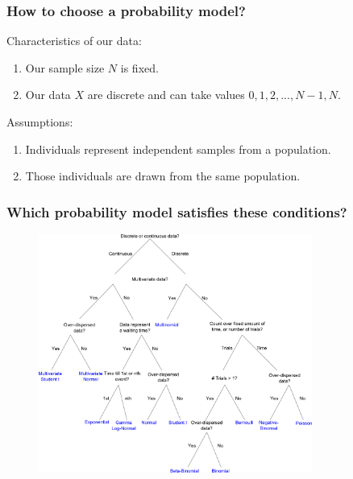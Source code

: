 \documentclass[handout]{beamer}
\begin{document}
\begin{frame}
	\frametitle{How to choose a probability model?}
	
	Characteristics of our data:
	
	\begin{enumerate}
		\item Our sample size $N$ is fixed.
		\item Our data $X$ are discrete and can take values $0, 1, 2, ..., N-1, N$.
	\end{enumerate}
	
	Assumptions:
	
	\begin{enumerate}
		\item Individuals represent independent samples from a population.
		\item Those individuals are drawn from the same population.
	\end{enumerate}
	
\end{frame}

\begin{frame}
	\frametitle{Which probability model satisfies these conditions?}
	\begin{figure}[h]
		\centerline{\includegraphics[width=0.8\textwidth]{animations_figures/Distributions_likelihoodTree.pdf}}
	\end{figure}
	
\end{frame}
\end{document}
